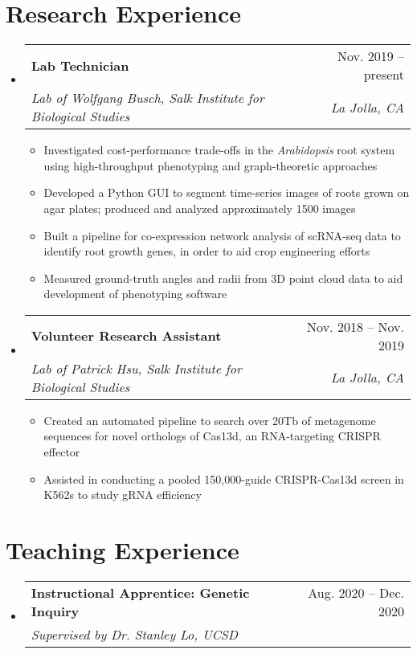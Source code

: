 \documentclass[letterpaper,11pt]{article}
\makeatletter
\newcommand{\resumeItem}[1]{
  \item\small{
    {#1 \vspace{-2pt}}
  }
}
\newcommand{\resumeSubheading}[4]{
  \vspace{-2pt}\item
    \begin{tabular*}{0.97\textwidth}[t]{l@{\extracolsep{\fill}}r}
      \textbf{#1} & #2 \\
      \textit{\small#3} & \textit{\small #4} \\
    \end{tabular*}\vspace{-7pt}
}
\newcommand{\resumeSubSubheading}[2]{
    \item
    \begin{tabular*}{0.97\textwidth}{l@{\extracolsep{\fill}}r}
      \textit{\small#1} & \textit{\small #2} \\
    \end{tabular*}\vspace{-7pt}
}
\newcommand{\resumeSubHeadingListStart}{\begin{itemize}[leftmargin=0.15in, label={}]}
\newcommand{\resumeSubHeadingListEnd}{\end{itemize}}
\newcommand{\resumeItemListStart}{\begin{itemize}}
\newcommand{\resumeItemListEnd}{\end{itemize}\vspace{-5pt}}
\makeatother
\begin{document}
\section{Research Experience}
  \resumeSubHeadingListStart
    \resumeSubheading
      {Lab Technician}{Nov. 2019 -- present}
      {Lab of Wolfgang Busch, Salk Institute for Biological Studies}{La Jolla, CA}
      \resumeItemListStart
        \resumeItem{Investigated cost-performance trade-offs in the \emph{Arabidopsis} root system using high-throughput phenotyping and graph-theoretic approaches}
        \resumeItem{Developed a Python GUI to segment time-series images of roots grown on agar plates; produced and analyzed approximately 1500 images}
        \resumeItem{Built a pipeline for co-expression network analysis of scRNA-seq data to identify root growth genes, in order to aid crop engineering efforts}
        \resumeItem{Measured ground-truth angles and radii from 3D point cloud data to aid development of phenotyping software}
      \resumeItemListEnd
    \resumeSubheading
      {Volunteer Research Assistant}{Nov. 2018 -- Nov. 2019}
      {Lab of Patrick Hsu, Salk Institute for Biological Studies}{La Jolla, CA}
      \resumeItemListStart
        \resumeItem{Created an automated pipeline to search over 20Tb of metagenome sequences for novel orthologs of Cas13d, an RNA-targeting CRISPR effector}
        \resumeItem{Assisted in conducting a pooled 150,000-guide CRISPR-Cas13d screen in K562s to study gRNA efficiency}
    \resumeItemListEnd
  \resumeSubHeadingListEnd



\section{Teaching Experience}
  \resumeSubHeadingListStart
    \resumeSubheading
      {Instructional Apprentice: Genetic Inquiry}{Aug. 2020 -- Dec. 2020}
      {Supervised by Dr. Stanley Lo, UCSD}{}
  \resumeSubHeadingListEnd

\end{document}

